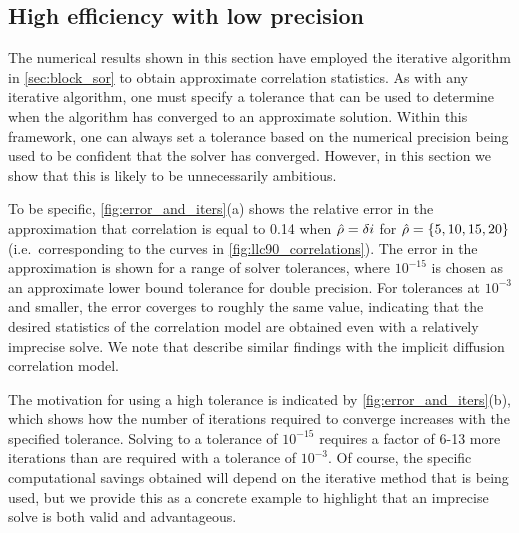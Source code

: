 \subsection{High efficiency with low precision}
\label{ssec:tolerance}

The numerical results shown in this section have employed the
iterative algorithm in \cref{sec:block_sor} to obtain approximate correlation
statistics.
As with any iterative algorithm, one must specify a
tolerance that can be used to determine when the algorithm has converged to an
approximate solution.
Within this framework, one can always set a tolerance based on the numerical
precision being used to be confident that the solver has converged.
However, in this section we show that this is likely to be
unnecessarily ambitious.

To be specific, \cref{fig:error_and_iters}(a) shows the relative error in the
approximation that correlation is equal to 0.14 when $\hat{\rho} = \delta i$
for $\hat{\rho} = \{5, 10, 15, 20\}$ (i.e.\ corresponding to the curves in
\cref{fig:llc90_correlations}).
The error in the approximation is shown for a range of solver tolerances,
where $10^{-15}$ is chosen as an approximate lower bound tolerance for double
precision.
For tolerances at $10^{-3}$ and smaller, the error coverges to roughly the same
value, indicating that the desired statistics of the correlation
model are obtained even with a relatively imprecise solve.
We note that \citet{carrier_background-error_2010} describe similar findings
with the implicit diffusion correlation model.

The motivation for using a high tolerance is indicated by
\cref{fig:error_and_iters}(b), which shows how the number of iterations required
to converge increases with the specified tolerance.
Solving to a tolerance of $10^{-15}$ requires a factor of 6-13
more iterations than are required with a tolerance of $10^{-3}$.
Of course, the specific computational savings obtained will depend on the
iterative method that is being used, but we provide this as a concrete example
to highlight that an imprecise solve is both valid and advantageous.

